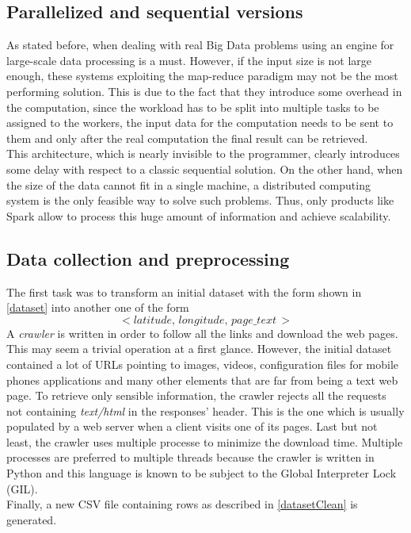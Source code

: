 \documentclass{sig-alternate-05-2015}
\begin{document}
\subsection{Parallelized and sequential versions}
As stated before, when dealing with real Big Data problems using an engine for large-scale data processing is a must. However, if the input size is not large enough, these systems exploiting the map-reduce paradigm may not be the most performing solution. This is due to the fact that they introduce some overhead in the computation, since the workload has to be split into multiple tasks to be assigned to the workers, the input data for the computation needs to be sent to them and only after the real computation the final result can be retrieved.\\
This architecture, which is nearly invisible to the programmer, clearly introduces some delay with respect to a classic sequential solution. On the other hand, when the size of the data cannot fit in a single machine, a distributed computing system is the only feasible way to solve such problems. Thus, only products like Spark allow to process this huge amount of information and achieve scalability.
\subsection{Data collection and preprocessing}\label{preprocessing}
The first task was to transform an initial dataset with the form shown in \ref{dataset} into another one of the form
\begin{equation}\label{datasetClean}
    <latitude,\,longitude,\,page\_text\,>
\end{equation}
A \emph{crawler} is written in order to follow all the links and download the web pages. This may seem a trivial operation at a first glance. However, the initial dataset contained a lot of URLs pointing to images, videos, configuration files for mobile phones applications and many other elements that are far from being a text web page. To retrieve only sensible information, the crawler rejects all the requests not containing \emph{text/html} in the responses' header. This is the one which is usually populated by a web server when a client visits one of its pages. Last but not least, the crawler uses multiple processe to minimize the download time. Multiple processes are preferred to multiple threads because the crawler is written in Python and this language is known to be subject to the Global Interpreter Lock\cite{gil} (GIL).\\
Finally, a new CSV file containing rows as described in \ref{datasetClean} is generated.
\end{document}
